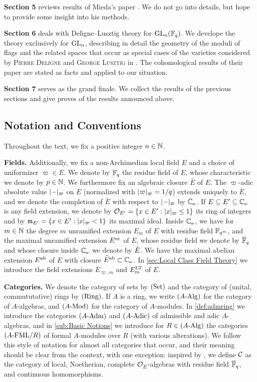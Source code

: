 \documentclass[../main.tex]{subfiles}
\begin{document}
\textbf{Section 5} reviews results of Mieda's paper \cite{mieda2016geometric}.
We do not go into details, but hope to provide some insight into his methods. 

\textbf{Section 6} deals with Deligne--Lusztig theory for $\operatorname{GL}_n(\mathbb{F}_q)$. 
We develope the theory exclusively for $\operatorname{GL}_n$, describing in detail the 
geometry of the moduli of flags and the related spaces that occur as 
special cases of the varieties considered by 
\textsc{Pierre Deligne} and \textsc{George Lusztig} in
\cite{delignelusztig1976}. The cohomological results of their paper are 
stated as facts and applied to our situation.

\textbf{Section 7} serves as the grand finale. We collect the results of the
previous sections and give proves of the results announced above. 

\subsection*{Notation and Conventions} %
Throughout the text, we fix a positive integer $n \in \mathbb{N}$.

\textbf{Fields.} Additionally, we fix a non-Archimedian local field $E$
and a choice of uniformizer $\varpi \in E$. We denote by $\mathbb{F}_q$ the residue
field of $E$, whose characteristic we denote by $p \in \mathbb{N}$. We furthermore fix
an algebraic closure $\bar E$ of $E$. The $\varpi$-adic absolute value $\lvert - \rvert_\varpi$ on $E$ (normalized with $\lvert \varpi \rvert_\varpi = 1/q$) extends uniquely
to $\bar E$, and we denote the completion of $\bar E$ with respect to $\lvert - \rvert_\varpi$ by $\Cp$. If $E \subseteq E' \subseteq \Cp$ is any
field extension, we denote by $\mathcal{O}_{E'} = \{x \in E' : \lvert x \rvert_\varpi \leq 1\}$
its ring of integers and by $\mathfrak{m}_{E'} = \{x \in E' : \lvert x \rvert_{\varpi} < 1\}$ its
maximal ideal. Inside $\Cp$, we have for $m\in \mathbb{N}$ the degree $m$ unramified
extension $E_m$ of $E$ with residue field $\mathbb{F}_{q^m}$, and the maximal unramified extension
$E^{\mathrm{nr}}$ of $E$, whose residue field we denote by ${\overline {\mathbb{F}}_q}$ and whose closure
inside $\Cp$ we denote by ${\breve {E}}$. We have the maximal abelian extension $E^{\mathrm{ab}}$ of 
$E$ with closure $\hat E^\ab \subset \Cp$. In \cref{sec:Local Class Field Theory} we 
introduce the field extensions $E_{\varpi, m}$ and $E^{\mathrm{LT}}_m$ of $E$.

\textbf{Categories.} 
We denote the category of sets by ${(\mathrm{Set})}$ and the category of (unital,
commututative) rings by ${(\mathrm{Ring})}$. If $A$ is a ring, we write ${({A}\textnormal-\allowbreak\mathrm{Alg})}$ for the
category of $A$-algebras, and ${({A}\textnormal-\allowbreak\mathrm{Mod})}$ for the category of $A$-modules.
In \cref{def:admring} we introduce the categories ${({A}\textnormal-\allowbreak\mathrm{Adm})}$ and ${({A}\textnormal-\allowbreak\mathrm{Adic})}$ of 
admissible and adic $A$-algebras, and in \cref{sub:Basic Notions} we introduce 
for $R \in {({A}\textnormal-\allowbreak\mathrm{Alg})}$ the categories ${({A}\textnormal-\allowbreak\mathrm{FML}/{R})}$ of formal $A$-modules over $R$
(with various alterations). We follow this style of notation for almost all categories
that occur, and their meaning should be clear from the context, with one exception:
inspired by \cite{drinfel1974elliptic}, we define $\mathcal{C}$ as the category of
local, Noetherian, complete $\mathcal{O}_{\breve {E}}$-algebras with residue field ${\overline {\mathbb{F}}_q}$,
and continuous homomorphisms.
\end{document}
